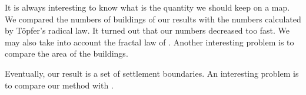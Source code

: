 It is always interesting to know what is the quantity we should keep on a map.
We compared the numbers of buildings of our results 
with the numbers calculated by T\"opfer's radical law.
It turned out that our numbers decreased too fast.
We may also take into account the fractal law of \citet{Jiang2015}.
Another interesting problem is to compare the area of the buildings.

Eventually, our result is a set of settlement boundaries. An interesting 
problem is to compare our method with \citet{Chaudhry2008}.



